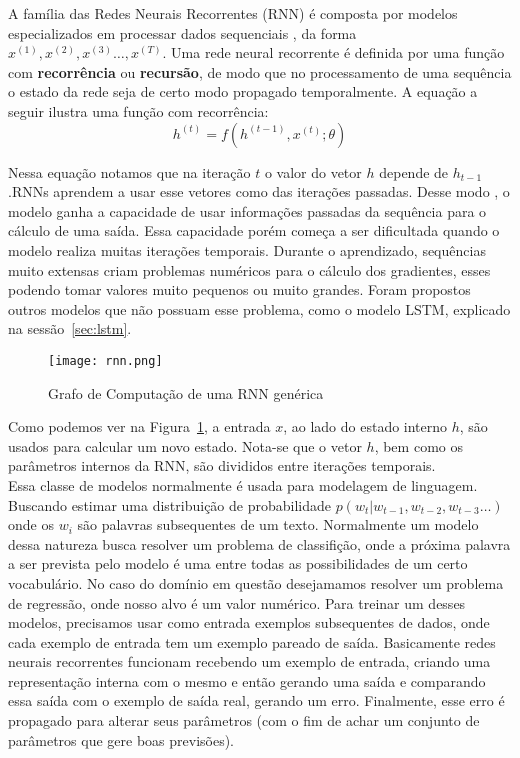 A família das Redes Neurais Recorrentes (RNN) é composta por modelos especializados
em processar dados sequenciais \citep{dlbook}, da forma $x^{(1)},x^{(2)} ,x^{(3)}\dots ,x^{(T)}$. Uma rede neural recorrente é definida por uma função com
\textbf{recorrência} ou \textbf{recursão}, de modo que no processamento de uma
sequência o estado da rede seja de certo modo propagado temporalmente. A equação
a seguir ilustra uma função com recorrência: \\

\[h^{(t)} = f(h^{(t-1)},x^{(t)};\theta)\]

Nessa equação notamos que na iteração $t$ o valor do vetor $h$ depende de
$h_{t-1}$.RNNs aprendem a usar esse vetores como
 das iterações passadas. Desse modo , o modelo ganha a capacidade
de usar informações passadas da sequência para o cálculo
de uma saída. Essa capacidade porém começa a ser dificultada quando o modelo
realiza muitas iterações temporais. Durante o aprendizado, sequências muito
extensas criam problemas numéricos para o cálculo dos gradientes, esses podendo
tomar valores muito pequenos ou muito grandes. Foram propostos outros modelos
que não possuam esse problema, como o modelo LSTM, explicado na sessão~\ref{sec:lstm}. 

\begin{figure}[H]
\centering
\texttt{[image: rnn.png]}
\caption{Grafo de Computação de uma RNN genérica \citep{dlbook}}
\label{fig:rnngraph}
\end{figure}

Como podemos ver na Figura~\ref{fig:rnngraph}, a entrada $x$, ao lado do estado
interno $h$, são usados para calcular um novo estado. Nota-se que o vetor $h$,
bem como os parâmetros internos da RNN, são divididos entre iterações temporais.
\\

Essa classe de modelos normalmente é usada para modelagem de linguagem. Buscando
estimar uma distribuição de probabilidade $p(w_t | w_{t-1},w_{t-2},w_{t-3} \dots
) $ onde os $w_i$ são palavras subsequentes de um texto. Normalmente um modelo
dessa natureza busca resolver um problema de classifição, onde a próxima palavra
a ser prevista pelo modelo é uma entre todas as possibilidades de um certo
vocabulário. No caso do domínio em questão desejamamos resolver um problema de
regressão, onde nosso alvo é um valor numérico. Para treinar um desses modelos,
precisamos usar como entrada exemplos subsequentes de dados, onde cada exemplo
de entrada tem um exemplo pareado de saída. Basicamente redes neurais
recorrentes funcionam recebendo um exemplo de entrada, criando uma representação
interna com o mesmo e então gerando uma saída e comparando essa saída com o
exemplo de saída real, gerando um erro. Finalmente, esse erro é propagado para
alterar seus parâmetros (com o fim de achar um conjunto de parâmetros que gere
boas previsões). \\ 


